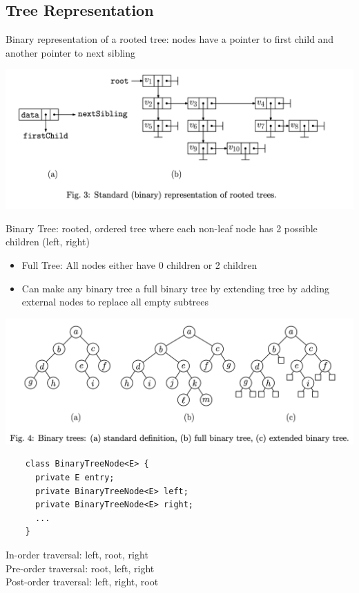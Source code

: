 \documentclass{article}
\begin{document}
  \subsection{Tree Representation}
  Binary representation of a rooted tree: nodes have a pointer to first child and another pointer to next sibling
  \begin{center}
    \includegraphics[scale=0.3]{Fig_3}
  \end{center}
  Binary Tree: rooted, ordered tree where each non-leaf node has 2 possible children (left, right)
  \begin{itemize}[noitemsep]
  \item Full Tree: All nodes either have 0 children or 2 children
  \item Can make any binary tree a full binary tree by extending tree by adding external nodes to replace all empty subtrees
  \end{itemize}
  \begin{center}
  \includegraphics[scale=0.4]{Fig_4}
  \end{center}
  \begin{lstlisting}
    class BinaryTreeNode<E> {
      private E entry;
      private BinaryTreeNode<E> left;
      private BinaryTreeNode<E> right;
      ...
    }
  \end{lstlisting}
  In-order traversal: left, root, right \\
  Pre-order traversal: root, left, right \\ 
  Post-order traversal: left, right, root\\
  \newpage
\end{document}
